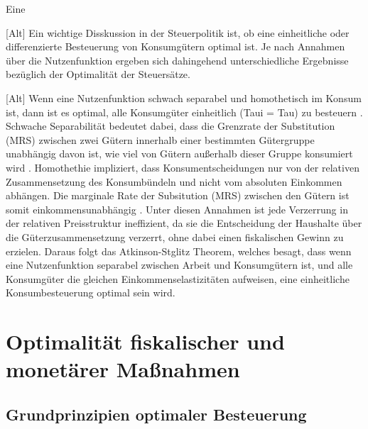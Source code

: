 
Eine 



[Alt] Ein wichtige Disskussion in der Steuerpolitik ist, ob eine einheitliche oder differenzierte Besteuerung von Konsumgütern optimal ist. Je nach Annahmen über die Nutzenfunktion ergeben sich dahingehend unterschiedliche Ergebnisse bezüglich der Optimalität der Steuersätze. 

[Alt] Wenn eine Nutzenfunktion schwach separabel und homothetisch im Konsum ist, dann ist es optimal, alle Konsumgüter einheitlich (Taui = Tau) zu besteuern \cite{ChariKohoe1999}. Schwache Separabilität bedeutet dabei, dass die Grenzrate der Substitution (MRS) zwischen zwei Gütern innerhalb einer bestimmten Gütergruppe unabhängig davon ist, wie viel von Gütern außerhalb dieser Gruppe konsumiert wird \cite{Cherchye et al}. Homothethie impliziert, dass Konsumentscheidungen nur von der relativen Zusammensetzung des Konsumbündeln und nicht vom absoluten Einkommen abhängen. Die marginale Rate der Subsitution (MRS) zwischen den Gütern ist somit einkommensunabhängig \cite{AtkinsonStiglitz1980}. Unter diesen Annahmen ist jede Verzerrung in der relativen Preisstruktur ineffizient, da sie die Entscheidung der Haushalte über die Güterzusammensetzung verzerrt, ohne dabei einen fiskalischen Gewinn zu erzielen. 
Daraus folgt das Atkinson-Stglitz Theorem, welches besagt, dass wenn eine Nutzenfunktion separabel zwischen Arbeit und Konsumgütern ist, und alle Konsumgüter die gleichen Einkommenselastizitäten aufweisen, eine einheitliche Konsumbesteuerung optimal sein wird.


\newpage

\section{Optimalität fiskalischer und monetärer Ma{\ss}nahmen}

\subsection{Grundprinzipien optimaler Besteuerung} 



